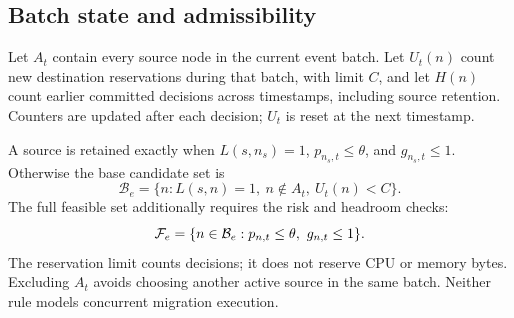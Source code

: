 \subsection{Batch state and admissibility}
Let $A_t$ contain every source node in the current event batch. Let
$U_t(n)$ count new destination reservations during that batch, with
limit $C$, and let $H(n)$ count earlier committed decisions across
timestamps, including source retention. Counters are updated after each
decision; $U_t$ is reset at the next timestamp.

A source is retained exactly when $L(s,n_s)=1$, $p_{n_s,t}\leq\theta$,
and $g_{n_s,t}\leq1$. Otherwise the base candidate set is
\begin{equation}\label{eq:base}
\mathcal B_e=\{n:L(s,n)=1,\ n\notin A_t,\ U_t(n)<C\}.
\end{equation}
The full feasible set additionally requires the risk and headroom checks:
\begin{equation}\label{eq:feasible}
\mathcal{F}_e=\{n\in\mathcal B_e:p_{n,t}\leq\theta,\ g_{n,t}\leq1\}.
\end{equation}
The reservation limit counts decisions; it does not reserve CPU or memory
bytes. Excluding $A_t$ avoids choosing another active source in the same
batch. Neither rule models concurrent migration execution.
